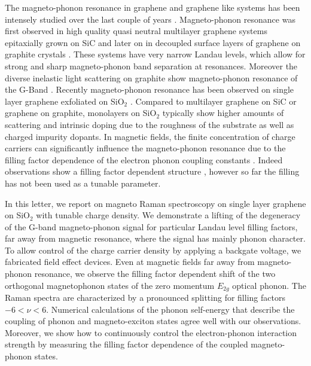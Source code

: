 \documentclass[prl,aps,superscriptaddress,reprint]{revtex4-1}
\begin{document}
The magneto-phonon resonance in graphene and graphene like systems has been intensely studied over the last couple of years \cite{goler2012raman}. Magneto-phonon resonance was first observed in high quality quasi neutral multilayer graphene systems epitaxially grown on SiC \cite{faugeras2009tuning} and later on in decoupled surface layers of graphene on graphite crystals \cite{kuhne2012polarization,faugeras2011magneto,yan2010observation}. These systems have very narrow Landau levels, which allow for strong and sharp magneto-phonon band separation at resonances. Moreover the diverse inelastic light scattering on graphite show magneto-phonon resonance of the G-Band \cite{PhysRevLett.110.227402,kossacki2011electronic,PhysRevB.80.241404,yan2010observation}. Recently magneto-phonon resonance has been observed on single layer graphene exfoliated on SiO$_2$ \cite{PhysRevLett.110.227402,kossacki2012circular}. Compared to multilayer graphene on SiC or graphene on graphite, monolayers on SiO$_2$ typically show higher amounts of scattering and intrinsic doping due to the roughness of the substrate as well as charged impurity dopants. In magnetic fields, the finite concentration of charge carriers can significantly influence the magneto-phonon resonance due to the filling factor dependence of the electron phonon coupling constants \cite{goerbig2007filling,goerbig2011electronic}. Indeed observations show a filling factor dependent structure \cite{PhysRevLett.110.227402,kossacki2012circular}, however so far the filling has not been used as a tunable parameter. 

In this letter, we report on magneto Raman spectroscopy on single layer graphene on SiO$_2$ with tunable charge density. We demonstrate a lifting of the degeneracy of the G-band magneto-phonon signal for particular Landau level filling factors, far away from magnetic resonance, where the signal has mainly phonon character. To allow control of the charge carrier density by applying a backgate voltage, we fabricated field effect devices. Even at magnetic fields far away from magneto-phonon resonance, we observe the filling factor dependent shift of the two orthogonal magnetophonon states of the zero momentum $E_{2g}$ optical phonon. The Raman spectra are characterized by a pronounced splitting for filling factors $-6<\nu<6$. Numerical calculations of the phonon self-energy that describe the coupling of phonon and magneto-exciton states agree well with our observations. Moreover, we show how to continuously control the electron-phonon interaction strength by measuring the filling factor dependence of the coupled magneto-phonon states. 
\end{document}
